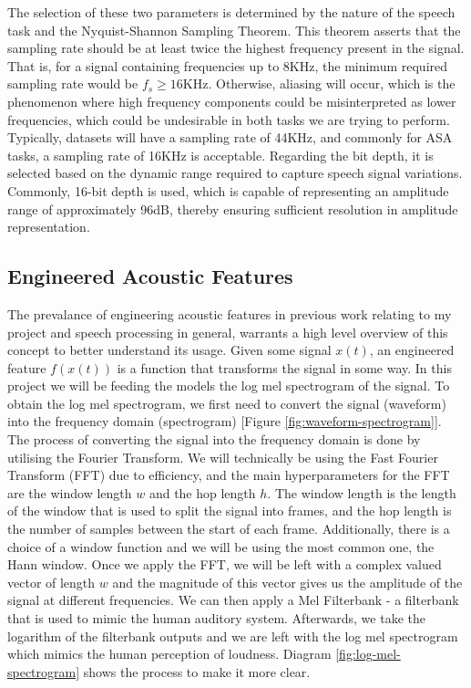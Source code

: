 \documentclass[logo,bsc,singlespacing,parskip,online]{infthesis}
\begin{document}
The selection of these two parameters is determined by the nature of the speech task and the Nyquist-Shannon Sampling Theorem.
This theorem asserts that the sampling rate should be at least twice the highest frequency present in the signal. 
That is, for a signal containing frequencies up to 8KHz, the minimum required sampling rate would be $f_s \ge 16$KHz.
Otherwise, aliasing will occur, which is the phenomenon where high frequency components could be misinterpreted as lower frequencies,
which could be undesirable in both tasks we are trying to perform. Typically, datasets will have a sampling rate 
of 44KHz, and commonly for ASA tasks, a sampling rate of 16KHz is acceptable. 
Regarding the bit depth, it is selected based on the dynamic range required to capture speech signal variations. 
Commonly, 16-bit depth is used, which is capable of representing an amplitude range of approximately 96dB, thereby ensuring sufficient resolution in amplitude representation.

\subsection{Engineered Acoustic Features}
The prevalance of engineering acoustic features in previous work relating to my project and speech processing in general,
warrants a high level overview of this concept to better understand its usage. 
Given some signal $x(t)$, an engineered feature $f(x(t))$ is a function that transforms the signal in some way.
In this project we will be feeding the models the log mel spectrogram of the signal. To obtain the log mel spectrogram, 
we first need to convert the signal (waveform) into the frequency domain (spectrogram) [Figure \ref{fig:waveform-spectrogram}].
The process of converting the signal into the frequency domain is done by utilising 
the Fourier Transform. We will technically be using the Fast Fourier Transform (FFT) 
due to efficiency, and the main hyperparameters for the FFT are the window length $w$ 
and the hop length $h$. The window length is the length of the window that is used to 
split the signal into frames, and the hop length is the number of samples between the 
start of each frame. Additionally, there is a choice of a window function and we will 
be using the most common one, the Hann window. Once we apply the FFT, we will be 
left with a complex valued vector of length $w$ and the magnitude of this vector 
gives us the amplitude of the signal at different frequencies. 
We can then apply a Mel Filterbank - a filterbank that is used to mimic the human auditory system. 
Afterwards, we take the logarithm of the filterbank outputs and we are left with the log mel spectrogram 
which mimics the human perception of loudness. Diagram \ref{fig:log-mel-spectrogram} shows the process to make it more clear.
\end{document}
